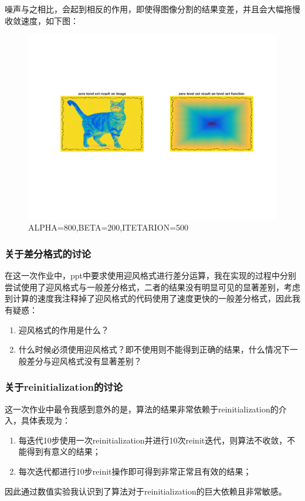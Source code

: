 \documentclass[a4paper, UTF8]{ctexrep}
\begin{document}
			\clearpage
			噪声与之相比，会起到相反的作用，即使得图像分割的结果变差，并且会大幅拖慢收敛速度，如下图：
			\begin{figure}[htbp!]
				\centering
				\includegraphics[width=\textwidth]{hw3_fig13.png}
				\caption{ALPHA=800,BETA=200,ITETARION=500}
				\label{fig:figure1}
			\end{figure}

		\subsubsection{关于差分格式的讨论} %
		\label{ssub:关于差分格式的讨论}
			在这一次作业中，ppt中要求使用迎风格式进行差分运算，我在实现的过程中分别尝试使用了迎风格式与一般差分格式，二者的结果没有明显可见的显著差别，考虑到计算的速度我注释掉了迎风格式的代码使用了速度更快的一般差分格式，因此我有疑惑：
			\begin{enumerate}
				\item 迎风格式的作用是什么？
				\item 什么时候必须使用迎风格式？即不使用则不能得到正确的结果，什么情况下一般差分与迎风格式没有显著差别？
			\end{enumerate}
		\subsubsection{关于reinitialization的讨论} %
		\label{ssub:关于reinitialization的讨论}
			这一次作业中最令我感到意外的是，算法的结果非常依赖于reinitialization的介入，具体表现为：
			\begin{enumerate}
				\item 每迭代10步使用一次reinitialization并进行10次reinit迭代，则算法不收敛，不能得到有意义的结果；
				\item 每次迭代都进行10步reinit操作即可得到非常正常且有效的结果；
			\end{enumerate}
			因此通过数值实验我认识到了算法对于reinitialization的巨大依赖且非常敏感。
\end{document}
